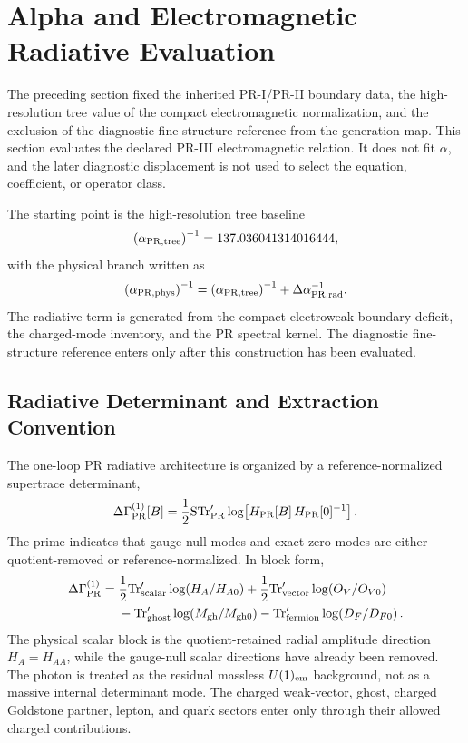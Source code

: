 \documentclass[11pt]{article}
\begin{document}
\section{Alpha and Electromagnetic Radiative Evaluation}
\label{sec:priii-alpha-radiative-closure}

The preceding section fixed the inherited PR-I/PR-II boundary data, the
high-resolution tree value of the compact electromagnetic normalization, and the exclusion of the diagnostic fine-structure reference from the generation map.  This section evaluates the declared PR-III electromagnetic relation. It does not fit \(\alpha\), and the later diagnostic displacement is not used to select the equation, coefficient, or operator class.

The starting point is the high-resolution tree baseline
\begin{equation}
\left(\alpha_{\rm PR,tree}\right)^{-1}
=
137.036041314016444 ,
\end{equation}
with the physical branch written as
\begin{equation}
\left(\alpha_{\rm PR,phys}\right)^{-1}
=
\left(\alpha_{\rm PR,tree}\right)^{-1}
+
\Delta\alpha_{\rm PR,rad}^{-1}.
\end{equation}
The radiative term is generated from the compact electroweak boundary deficit, the charged-mode inventory, and the PR spectral kernel.  The diagnostic fine-structure reference enters only after this construction has been evaluated.

\subsection{Radiative Determinant and Extraction Convention}
\label{subsec:priii-radiative-determinant-extraction}

The one-loop PR radiative architecture is organized by a reference-normalized supertrace determinant,
\begin{equation}
\Delta\Gamma_{\rm PR}^{(1)}[B]
=
\frac12
{\rm STr}_{\rm PR}^{\prime}
\log\!\left[
H_{\rm PR}[B]\,H_{\rm PR}[0]^{-1}
\right].
\label{eq:priii-reference-normalized-supertrace}
\end{equation}
The prime indicates that gauge-null modes and exact zero modes are either quotient-removed or reference-normalized.  In block form,
\begin{align}
\Delta\Gamma_{\rm PR}^{(1)}
=&\;
\frac12 {\rm Tr}_{\rm scalar}^{\prime}
\log\!\left(H_A/H_{A0}\right)
+
\frac12 {\rm Tr}_{\rm vector}^{\prime}
\log\!\left(O_V/O_{V0}\right) \nonumber\\
&\;
-
{\rm Tr}_{\rm ghost}^{\prime}
\log\!\left(M_{\rm gh}/M_{{\rm gh}0}\right)
-
{\rm Tr}_{\rm fermion}^{\prime}
\log\!\left(D_F/D_{F0}\right).
\end{align}
The physical scalar block is the quotient-retained radial amplitude direction \(H_A=H_{AA}\), while the gauge-null scalar directions have already been removed.  The photon is treated as the residual massless \(U(1)_{\rm em}\) background, not as a massive internal determinant mode.  The charged weak-vector, ghost, charged Goldstone partner, lepton, and quark sectors enter only through their allowed charged contributions.
\end{document}
